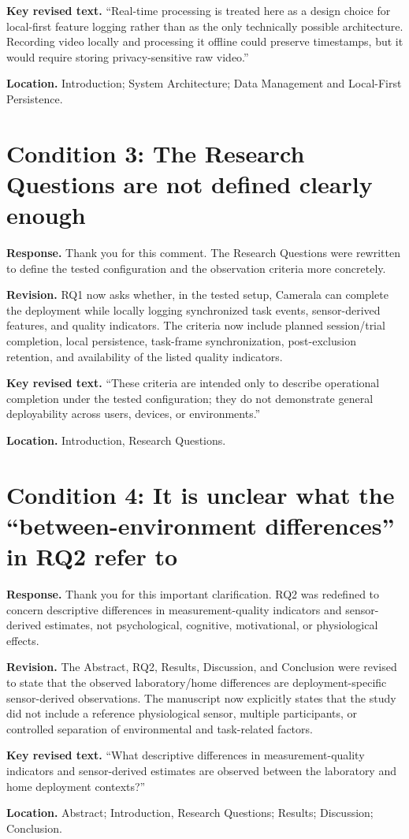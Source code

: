 \documentclass[11pt]{article}
\newcommand{\condition}[2]{\section*{Condition #1: #2}}
\begin{document}
\textbf{Key revised text.}
``Real-time processing is treated here as a design choice for local-first feature logging rather than as the only technically possible architecture. Recording video locally and processing it offline could preserve timestamps, but it would require storing privacy-sensitive raw video.''

\textbf{Location.}
Introduction; System Architecture; Data Management and Local-First Persistence.

\condition{3}{The Research Questions are not defined clearly enough}
\textbf{Response.}
Thank you for this comment.
The Research Questions were rewritten to define the tested configuration and the observation criteria more concretely.

\textbf{Revision.}
RQ1 now asks whether, in the tested setup, Camerala can complete the deployment while locally logging synchronized task events, sensor-derived features, and quality indicators.
The criteria now include planned session/trial completion, local persistence, task-frame synchronization, post-exclusion retention, and availability of the listed quality indicators.

\textbf{Key revised text.}
``These criteria are intended only to describe operational completion under the tested configuration; they do not demonstrate general deployability across users, devices, or environments.''

\textbf{Location.}
Introduction, Research Questions.

\condition{4}{It is unclear what the ``between-environment differences'' in RQ2 refer to}
\textbf{Response.}
Thank you for this important clarification.
RQ2 was redefined to concern descriptive differences in measurement-quality indicators and sensor-derived estimates, not psychological, cognitive, motivational, or physiological effects.

\textbf{Revision.}
The Abstract, RQ2, Results, Discussion, and Conclusion were revised to state that the observed laboratory/home differences are deployment-specific sensor-derived observations.
The manuscript now explicitly states that the study did not include a reference physiological sensor, multiple participants, or controlled separation of environmental and task-related factors.

\textbf{Key revised text.}
``What descriptive differences in measurement-quality indicators and sensor-derived estimates are observed between the laboratory and home deployment contexts?''

\textbf{Location.}
Abstract; Introduction, Research Questions; Results; Discussion; Conclusion.
\end{document}
